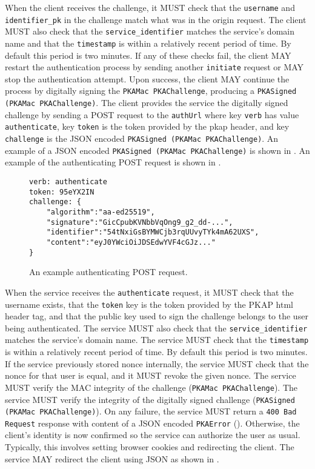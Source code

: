 \documentclass{article}
\newcommand{\pkap}{PKAP}
\begin{document}

When the client receives the challenge, it MUST check that the \texttt{username} and \texttt{identifier\_pk} in the challenge match what was in the origin request. 
The client MUST also check that the \texttt{service\_identifier} matches the service's domain name and that the \texttt{timestamp} is within a relatively recent period of time. 
By default this period is two minutes. 
If any of these checks fail, the client MAY restart the authentication process by sending another \texttt{initiate} request or MAY stop the authentication attempt. 
Upon success, the client MAY continue the process by digitally signing the \texttt{PKAMac PKAChallenge}, producing a \texttt{PKASigned (PKAMac PKAChallenge)}. 
The client provides the service the digitally signed challenge by sending a POST request to the \texttt{authUrl} where key \texttt{verb} has value \texttt{authenticate}, key \texttt{token} is the token provided by the pkap header, and key \texttt{challenge} is the JSON encoded \texttt{PKASigned (PKAMac PKAChallenge)}. 
An example of a JSON encoded \texttt{PKASigned (PKAMac PKAChallenge)} is shown in . 
An example of the authenticating POST request is shown in . 

\begin{figure}
\begin{lstlisting}
verb: authenticate
token: 95eYX2IN
challenge: {
    "algorithm":"aa-ed25519",
    "signature":"GicCpubKVNbbVqOng9_g2_dd-...",
    "identifier":"54tNxiGsBYMWCjb3rqUUvyTYk4mA62UXS",
    "content":"eyJ0YWciOiJDSEdwYVF4cGJz..."
}
\end{lstlisting}
\caption{An example authenticating POST request.}
\label{code:postauthenticate}
\end{figure}

When the service receives the \texttt{authenticate} request, it MUST check that the username exists, that the \texttt{token} key is the token provided by the \pkap{} html header tag,  and that the public key used to sign the challenge belongs to the user being authenticated. 
The service MUST also check that the \texttt{service\_identifier} matches the service's domain name. 
The service MUST check that the \texttt{timestamp} is within a relatively recent period of time. 
By default this period is two minutes. 
If the service previously stored nonce internally, the service MUST check that the nonce for that user is equal, and it MUST revoke the given nonce. 
The service MUST verify the MAC integrity of the challenge (\texttt{PKAMac PKAChallenge}). 
The service MUST verify the integrity of the digitally signed challenge (\texttt{PKASigned (PKAMac PKAChallenge)}). 
On any failure, the service MUST return a \texttt{400 Bad Request} response with content of a JSON encoded \texttt{PKAError} (). 
Otherwise, the client's identity is now confirmed so the service can authorize the user as usual. 
Typically, this involves setting browser cookies and redirecting the client. 
The service MAY redirect the client using JSON as shown in . 
\end{document}
